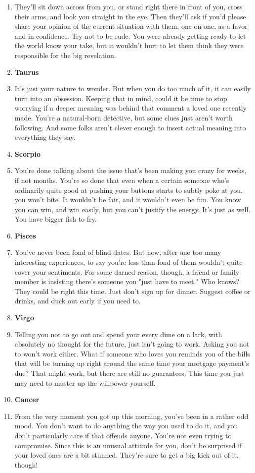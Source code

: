 \documentclass{article}[twocolumn]
\newcommand{\bb}[1]{\item[] \textbf{#1}}
\begin{document}
\begin{multicols}{2}
\begin{enumerate}
    \item They'll sit down across from you, or stand right there in front of you, cross their arms, and look you straight in the eye. Then they'll ask if you'd please share your opinion of the current situation with them, one-on-one, as a favor and in confidence. Try not to be rude. You were already getting ready to let the world know your take, but it wouldn't hurt to let them think they were responsible for the big revelation. \\
     \bb{Taurus}
    \item It's just your nature to wonder. But when you do too much of it, it can easily turn into an obsession. Keeping that in mind, could it be time to stop worrying if a deeper meaning was behind that comment a loved one recently made. You're a natural-born detective, but some clues just aren't worth following. And some folks aren't clever enough to insert actual meaning into everything they say.
     \bb{Scorpio}
    \item You're done talking about the issue that's been making you crazy for weeks, if not months. You're so done that even when a certain someone who's ordinarily quite good at pushing your buttons starts to subtly poke at you, you won't bite. It wouldn't be fair, and it wouldn't even be fun. You know you can win, and win easily, but you can't justify the energy. It's just as well. You have bigger fish to fry. \\
     \bb{Pisces}
    \item You've never been fond of blind dates. But now, after one too many interesting experiences, to say you're less than fond of them wouldn't quite cover your sentiments. For some darned reason, though, a friend or family member is insisting there's someone you "just have to meet." Who knows? They could be right this time. Just don't sign up for dinner. Suggest coffee or drinks, and duck out early if you need to. \\
     \bb{Virgo}
    \item Telling you not to go out and spend your every dime on a lark, with absolutely no thought for the future, just isn't going to work. Asking you not to won't work either. What if someone who loves you reminds you of the bills that will be turning up right around the same time your mortgage payment's due? That might work, but there are still no guarantees. This time you just may need to muster up the willpower yourself.\\
     \bb{Cancer}
    \item From the very moment you got up this morning, you've been in a rather odd mood. You don't want to do anything the way you used to do it, and you don't particularly care if that offends anyone. You're not even trying to compromise. Since this is an unusual attitude for you, don't be surprised if your loved ones are a bit stunned. They're sure to get a big kick out of it, though! \\

\end{enumerate}
\end{multicols}
\end{document}
